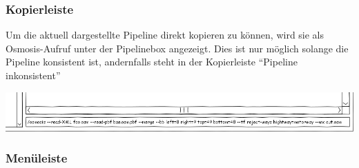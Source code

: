 \documentclass[a4paper,12pt]{scrartcl}
\begin{document}
\subsubsection{Kopierleiste}
Um die aktuell dargestellte Pipeline direkt kopieren zu können, wird sie als Osmosis-Aufruf unter der Pipelinebox angezeigt. Dies ist nur möglich
solange die Pipeline konsistent ist, andernfalls steht in der Kopierleiste ``Pipeline inkonsistent''
\begin{center}
\includegraphics[width=15cm]{ui_prototype/OsmUi_Leisteklein.png}
\end{center}

\subsubsection{Menüleiste}
\end{document}
